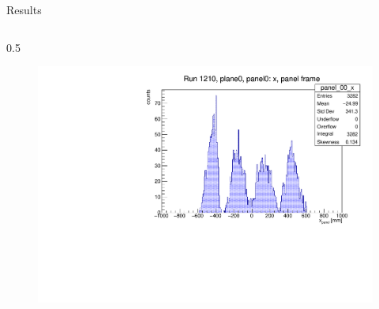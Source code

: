 \documentclass{beamer}[10pt]
\begin{document}
\begin{frame}{Results}
  \vspace{-3mm}
  \begin{columns}
    \begin{column}{0.5\framewidth}
      \begin{figure}[H]
        \centering
        \includegraphics[width= \textwidth]{figures/pdf/x_panel0.pdf}
        \label{fig:enter-label}
    \end{figure}
    \vspace{-12mm}


\end{column}
\end{columns}
\end{frame}
\end{document}

